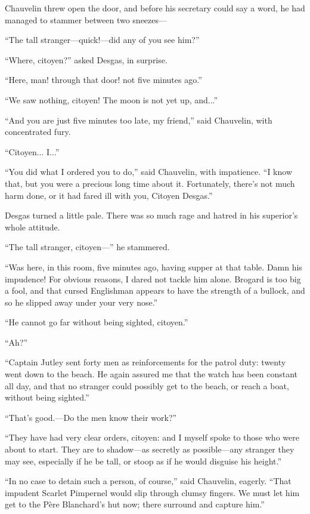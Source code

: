 \documentclass[paper=a5,BCOR=7mm,twoside,DIV=calc,12pt,usegeometry,chapterprefix,endperiod,headings=big]{scrbook}
\begin{document}
Chauvelin threw open the door, and before his secretary could say a word, he had managed to stammer between two sneezes---

\enquote{The tall stranger---quick!---did any of you see him?}

\enquote{Where, citoyen?} asked Desgas, in surprise.

\enquote{Here, man! through that door! not five minutes ago.}

\enquote{We saw nothing, citoyen! The moon is not yet up, and...}

\enquote{And you are just five minutes too late, my friend,} said Chauvelin, with concentrated fury.

\enquote{Citoyen... I...}

\enquote{You did what I ordered you to do,} said Chauvelin, with impatience. \enquote{I know that, but you were a precious long time about it. Fortunately, there's not much harm done, or it had fared ill with you, Citoyen Desgas.}

Desgas turned a little pale. There was so much rage and hatred in his superior's whole attitude.

\enquote{The tall stranger, citoyen---} he stammered.

\enquote{Was here, in this room, five minutes ago, having supper at that table. Damn his impudence! For obvious reasons, I dared not tackle him alone. Brogard is too big a fool, and that cursed Englishman appears to have the strength of a bullock, and so he slipped away under your very nose.}

\enquote{He cannot go far without being sighted, citoyen.}

\enquote{Ah?}

\enquote{Captain Jutley sent forty men as reinforcements for the patrol duty: twenty went down to the beach. He again assured me that the watch has been constant all day, and that no stranger could possibly get to the beach, or reach a boat, without being sighted.}

\enquote{That's good.---Do the men know their work?}

\enquote{They have had very clear orders, citoyen: and I myself spoke to those who were about to start. They are to shadow---as secretly as possible---any stranger they may see, especially if he be tall, or stoop as if he would disguise his height.}

\enquote{In no case to detain such a person, of course,} said Chauvelin, eagerly. \enquote{That impudent Scarlet Pimpernel would slip through clumsy fingers. We must let him get to the Père Blanchard's hut now; there surround and capture him.}
\end{document}

